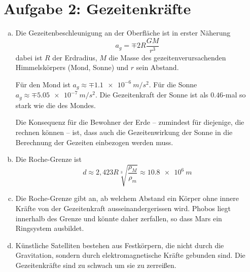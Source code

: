 \documentclass[a4paper,german,12pt,smallheadings]{scrartcl}
\begin{document}
\section*{Aufgabe 2: Gezeitenkräfte}
\begin{enumerate}[a)]
  \item
    Die Gezeitenbeschleunigung an der Oberfläche ist in erster Näherung
    \begin{equation}
      a_g = \mp 2 R \frac{GM}{r^3}
    \end{equation}
    dabei ist $R$ der Erdradius, $M$ die Masse des gezeitenverursachenden
    Himmelskörpers (Mond, Sonne) und $r$ sein Abstand.

    Für den Mond ist $a_g \approx \mp \SI{1.1e-6}{m/s^2}$. Für die Sonne $a_g
    \approx \mp \SI{5.05e-7}{m/s^2}$. Die Gezeitenkraft der Sonne ist als
    $\num{0.46}$-mal so stark wie die des Mondes.

    Die Konsequenz für die Bewohner der Erde -- zumindest für diejenige, die
    rechnen können -- ist, dass auch die Gezeitenwirkung der Sonne in die
    Berechnung der Gezeiten einbezogen werden muss.

  \item
    Die Roche-Grenze ist
    \begin{equation}
      d \approx 2{,}423 R \sqrt[3]{\frac{\rho_M}{\rho_m}} \approx \SI{10.8e6}{m}
    \end{equation}
  \item
    Die Roche-Grenze gibt an, ab welchem Abstand ein Körper ohne innere Kräfte
    von der Gezeitenkraft ausseinandergerissen wird. Phobos liegt innerhalb des
    Grenze und könnte daher zerfallen, so dass Mars ein Ringsystem ausbildet.
  \item
    Künstliche Satelliten bestehen aus Festkörpern, die nicht durch die
    Gravitation, sondern durch elektromagnetische Kräfte gebunden sind. Die
    Gezeitenkräfte sind zu schwach um sie zu zerreißen.
\end{enumerate}
\end{document}
